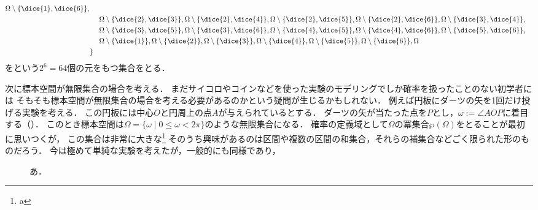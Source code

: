 \documentclass[../main.tex]{subfiles}
\begin{document}
\begin{align*}
        \Omega \setminus \{\dice{1}, \dice{6}\}, \\
    & \ \ \ \ 
        \Omega \setminus \{\dice{2}, \dice{3}\},
        \Omega \setminus \{\dice{2}, \dice{4}\},
        \Omega \setminus \{\dice{2}, \dice{5}\},
        \Omega \setminus \{\dice{2}, \dice{6}\},
        \Omega \setminus \{\dice{3}, \dice{4}\}, \\
    & \ \ \ \ 
        \Omega \setminus \{\dice{3}, \dice{5}\},
        \Omega \setminus \{\dice{3}, \dice{6}\},
        \Omega \setminus \{\dice{4}, \dice{5}\},
        \Omega \setminus \{\dice{4}, \dice{6}\},
        \Omega \setminus \{\dice{5}, \dice{6}\}, \\
    & \ \ \ \  \Omega \setminus \{\dice{1}\}, \Omega \setminus \{\dice{2}\}, \Omega \setminus \{\dice{3}\}, \Omega \setminus \{\dice{4}\}, \Omega \setminus \{\dice{5}\}, \Omega \setminus \{\dice{6}\}, \Omega \\
    & \}
\end{align*}
をという\(2^6 = 64\)個の元をもつ集合をとる．

次に標本空間が無限集合の場合を考える．
まだサイコロやコインなどを使った実験のモデリングでしか確率を扱ったことのない初学者には
そもそも標本空間が無限集合の場合を考える必要があるのかという疑問が生じるかもしれない．
例えば円板にダーツの矢を1回だけ投げる実験を考える．
この円板には中心\(O\)と円周上の点\(A\)が与えられているとする．
ダーツの矢が当たった点を\(P\)とし，\(\omega := \angle AOP\)に着目する（）．
このとき標本空間は\(\Omega = \{ \omega \mid 0 \leq \omega < 2\pi\}\)のような無限集合になる．
確率の定義域として\(\Omega\)の冪集合\(\wp(\Omega)\)をとることが最初に思いつくが，
この集合は非常に大きな\footnote{a}
そのうち興味があるのは区間や複数の区間の和集合，それらの補集合などごく限られた形のものだろう．
今は極めて単純な実験を考えたが，一般的にも同様であり，

\begin{figure}
    \centering
    \caption{あ．}\figlabel{darts}
\end{figure}
\end{document}
